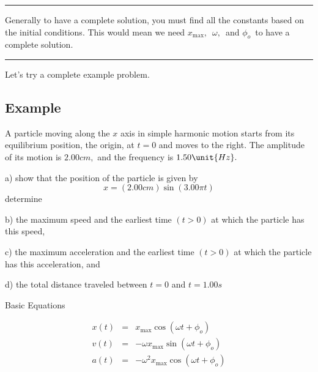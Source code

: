 \documentclass{book}
\begin{document}
\begin{center}
{\small \rule{300pt}{1pt}}

{\small Generally to have a complete solution, you must find all the
constants based on the initial conditions. This would mean we need }$x_{\max
},${\small \ }$\omega ,${\small \ and }$\phi _{o}${\small \ to have a
complete solution.}

{\small \rule{300pt}{1pt}}
\end{center}

Let's try a complete example problem.

\subsection{Example}

A particle moving along the $x$ axis in simple harmonic motion starts from
its equilibrium position, the origin, at $t=0$ and moves to the right. The
amplitude of its motion is $2.00\unit{cm},$ and the frequency is $1.50\unit{%
Hz}.$

a) show that the position of the particle is given by%
\begin{equation*}
x=\left( 2.00\unit{cm}\right) \sin \left( 3.00\pi t\right)
\end{equation*}%
determine

b) the maximum speed and the earliest time $(t>0)$ at which the particle has
this speed,

c) the maximum acceleration and the earliest time $(t>0)$ at which the
particle has this acceleration, and

d) the total distance traveled between $t=0$ and $t=1.00\unit{s}$


Basic Equations

\begin{eqnarray*}
x\left( t\right) &=&x_{\max }\cos \left( \omega t+\phi _{o}\right) \\
v\left( t\right) &=&-\omega x_{\max }\sin \left( \omega t+\phi _{o}\right) \\
a\left( t\right) &=&-\omega ^{2}x_{\max }\cos \left( \omega t+\phi
_{o}\right)
\end{eqnarray*}
\end{document}
